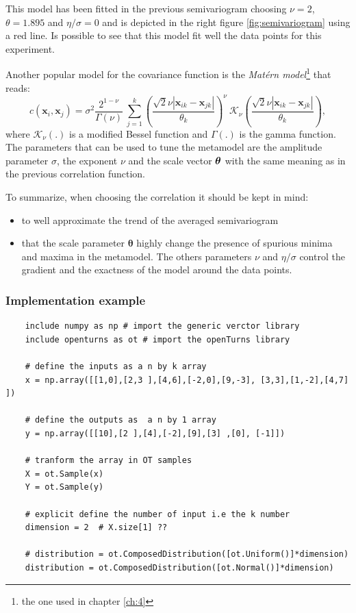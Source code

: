 This model has been fitted in the previous semivariogram choosing $\nu=2$, $\theta=1.895$ and $\eta / \sigma=0$ and is depicted in the right figure \ref{fig:semivariogram} using a red line. Is possible to see that this model fit well the data points for this experiment.

Another popular model for the covariance function is the \textit{Mat\'ern model}\footnote{the one used in chapter \ref{ch:4}} that reads:
\begin{equation}
c(\mathbf{x}_{i} , \mathbf{x}_{j}) = \sigma^2 \dfrac{2^{1- \nu}}{\Gamma(\nu)} \ \sum_{j=1}^{k} \left( \dfrac{\sqrt{2} \nu |\mathbf{x}_{ik} - \mathbf{x}_{jk} |}{\theta_k} \right)^{\nu} \ \mathcal{K}_{\nu}\left( \dfrac{\sqrt{2} \nu |\mathbf{x}_{ik} - \mathbf{x}_{jk} |}{\theta_k} \right),
\label{eq:matern2}
\end{equation}
where $\mathcal{K}_{\nu}(.)$ is a modified Bessel function and $\Gamma(.)$ is the gamma function.
The parameters that can be used to tune the metamodel are the amplitude parameter $\sigma$, the exponent $\nu$ and the scale vector $\boldsymbol{\theta}$ with the same meaning as in the previous correlation function.

To summarize, when choosing the correlation it should be kept in mind:
\begin{itemize}
	\item to well approximate the trend of the averaged semivariogram
	\item that the scale parameter $\boldsymbol{\theta}$ highly change the presence of spurious minima and maxima in the metamodel. The others parameters $\nu$ and $\eta / \sigma$ control the gradient and the exactness of the model around the data points.
\end{itemize}

\subsubsection{Implementation example}


\begin{verbatim}
	include numpy as np # import the generic verctor library
	include openturns as ot # import the openTurns library
	
	# define the inputs as a n by k array
	x = np.array([[1,0],[2,3 ],[4,6],[-2,0],[9,-3], [3,3],[1,-2],[4,7] ])
	
	# define the outputs as  a n by 1 array
	y = np.array([[10],[2 ],[4],[-2],[9],[3] ,[0], [-1]])
	
	# tranform the array in OT samples
	X = ot.Sample(x)
	Y = ot.Sample(y)
	
	# explicit define the number of input i.e the k number
	dimension = 2  # X.size[1] ??
	
	# distribution = ot.ComposedDistribution([ot.Uniform()]*dimension)
	distribution = ot.ComposedDistribution([ot.Normal()]*dimension)
\end{verbatim}

